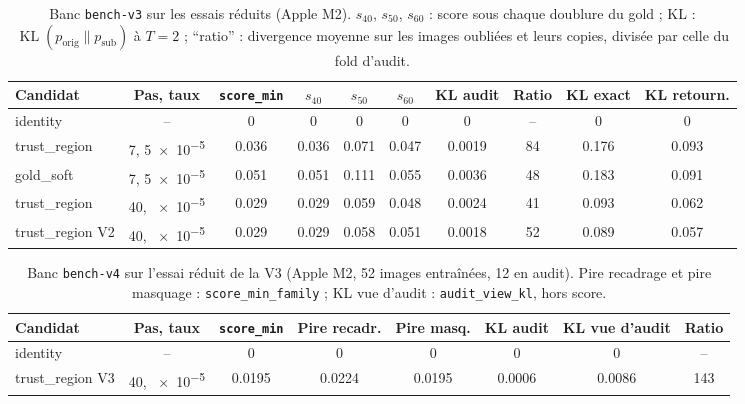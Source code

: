 \documentclass[11pt,a4paper]{article}
\newcommand{\KL}{\operatorname{KL}}
\newcommand{\orig}{\mathrm{orig}}
\newcommand{\sub}{\mathrm{sub}}
\newcommand{\code}[1]{\texttt{#1}}
\begin{document}
\begin{table}[ht]
  \centering\small
  \caption{Banc \code{bench-v3} sur les essais réduits (Apple M2). $s_{40}$, $s_{50}$, $s_{60}$ :
  score sous chaque doublure du gold ; KL : $\KL(p_\orig\|p_\sub)$ à $T=2$ ; \enquote{ratio} :
  divergence moyenne sur les images oubliées et leurs copies, divisée par celle du fold d'audit.}
  \label{tab:smoke}
  \setlength{\tabcolsep}{4.2pt}
  \begin{tabular}{@{}lc SSSS S[table-format=1.4] S[table-format=2.0] S[table-format=1.3]S[table-format=1.3]@{}}
    \toprule
    Candidat & Pas, taux & {\code{score\_min}} & {$s_{40}$} & {$s_{50}$} & {$s_{60}$} & {KL audit}
      & {Ratio} & {KL exact} & {KL retourn.}\\
    \midrule
    identity & -- & 0 & 0 & 0 & 0 & 0 & {--} & 0 & 0\\
    trust\_region & 7, \num{5e-5} & 0.036 & 0.036 & 0.071 & 0.047 & 0.0019 & 84 & 0.176 & 0.093\\
    gold\_soft & 7, \num{5e-5} & 0.051 & 0.051 & 0.111 & 0.055 & 0.0036 & 48 & 0.183 & 0.091\\
    trust\_region & 40, \num{e-5} & 0.029 & 0.029 & 0.059 & 0.048 & 0.0024 & 41 & 0.093 & 0.062\\
    trust\_region V2 & 40, \num{e-5} & 0.029 & 0.029 & 0.058 & 0.051 & 0.0018 & 52 & 0.089 & 0.057\\
    \bottomrule
  \end{tabular}
\end{table}

\begin{table}[ht]
  \centering\small
  \caption{Banc \code{bench-v4} sur l'essai réduit de la V3 (Apple M2, 52 images entraînées, 12 en
  audit). Pire recadrage et pire masquage : \code{score\_min\_family} ; KL vue d'audit :
  \code{audit\_view\_kl}, hors score.}\label{tab:smokev4}
  \begin{tabular}{@{}lc SSS S S[table-format=1.4] S[table-format=3.0]@{}}
    \toprule
    Candidat & Pas, taux & {\code{score\_min}} & {Pire recadr.} & {Pire masq.} & {KL audit}
      & {KL vue d'audit} & {Ratio}\\
    \midrule
    identity & -- & 0 & 0 & 0 & 0 & 0 & {--}\\
    trust\_region V3 & 40, \num{e-5} & 0.0195 & 0.0224 & 0.0195 & 0.0006 & 0.0086 & 143\\
    \bottomrule
  \end{tabular}
\end{table}
\end{document}
